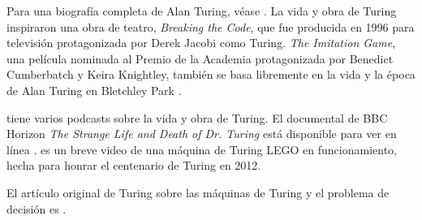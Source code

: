 \documentclass[../../../include/open-logic-section]{subfiles}
\begin{document}
\begin{reading}
Para una biografía completa de Alan Turing, véase \citet{Hodges2014}. La vida y obra de Turing inspiraron una obra de teatro, \emph{Breaking the Code}, que fue producida en 1996 para televisión protagonizada por Derek Jacobi como Turing. \emph{The Imitation Game}, una película nominada al Premio de la Academia protagonizada por Benedict Cumberbatch y Keira Knightley, también se basa libremente en la vida y la época de Alan Turing en Bletchley Park \citep{Imitation2014}.

\citet{Radiolab2012} tiene varios podcasts sobre la vida y obra de Turing. El documental de BBC Horizon \emph{The Strange Life and Death of Dr. Turing} está disponible para ver en línea \citep{Sykes1992}. \citep{Theelen2012} es un breve video de una máquina de Turing LEGO en funcionamiento, hecha para honrar el centenario de Turing en 2012.

El artículo original de Turing sobre las máquinas de Turing y el problema de decisión es \citet{Turing1937}.
\end{reading}
\end{document}
